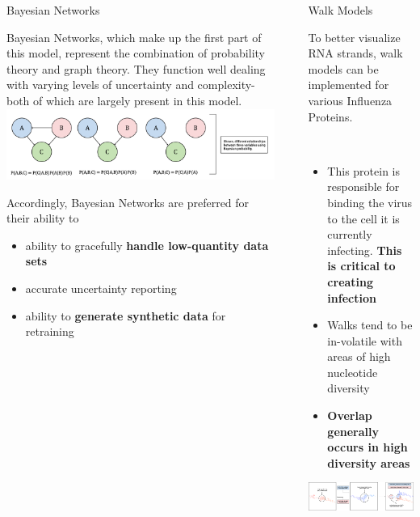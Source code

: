 \documentclass[final]{beamer}
\newlength{\sepwidth}
\newlength{\colwidth}
\newcommand{\separatorcolumn}{\begin{column}{\sepwidth}\end{column}}
\begin{document}
\begin{frame}[t]
\begin{columns}[t]
\begin{column}{\colwidth}
  \begin{block}{Bayesian Networks}

    Bayesian Networks, which make up the first part of this model, represent the combination of probability theory and graph theory. They function well dealing with varying levels of uncertainty and complexity- both of which are largely present in this model. 
    \vspace{0.2 in}
    \includegraphics[width = \textwidth]{Bayes.pdf}

    Accordingly, Bayesian Networks are preferred for their ability to
    \begin{itemize}
        \item ability to gracefully \textbf{handle low-quantity data sets}
        \item accurate uncertainty reporting
        \item ability to \textbf{generate synthetic data} for retraining
    \end{itemize}
    
  \end{block}

\end{column}

\separatorcolumn

\begin{column}{\colwidth}

  \begin{block}{Walk Models}

    To better visualize RNA strands, walk models can be implemented for various Influenza Proteins.

    \\
    \begin{itemize}
      \item This protein is responsible for binding the virus to the cell it is currently infecting. \textbf{This is critical to creating infection}
      \item Walks tend to be in-volatile with areas of high nucleotide diversity
      \item \textbf{Overlap generally occurs in high diversity areas}
    \end{itemize}
    \vspace{0.2 in}
    \includegraphics[width = \textwidth]{NA.pdf}


\end{block}
\end{column}
\end{columns}
\end{frame}
\end{document}
